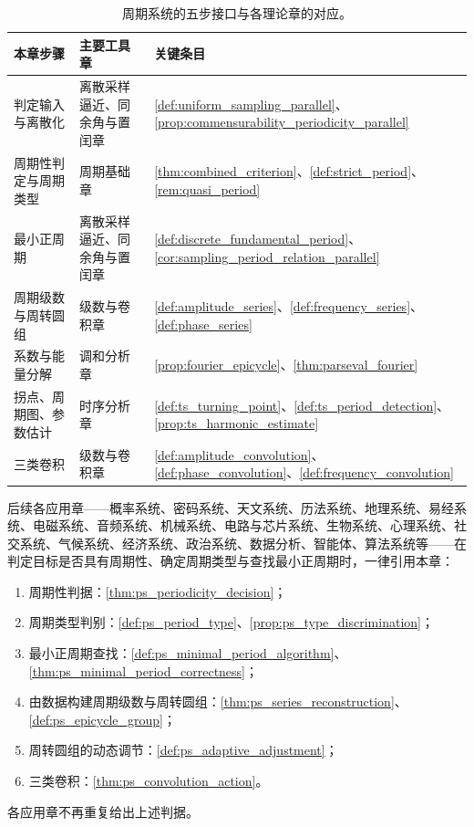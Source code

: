 \begin{table}[htbp]
\centering
\small
\begin{tabular}{@{}>{\raggedright\arraybackslash}p{4.6cm}>{\raggedright\arraybackslash}p{4.2cm}>{\raggedright\arraybackslash}p{5.6cm}@{}}
\toprule
本章步骤 & 主要工具章 & 关键条目 \\
\midrule
判定输入与离散化 & 离散采样逼近、同余角与置闰章 & \cref{def:uniform_sampling_parallel}、\cref{prop:commensurability_periodicity_parallel} \\
周期性判定与周期类型 & 周期基础章 & \cref{thm:combined_criterion}、\cref{def:strict_period}、\cref{rem:quasi_period} \\
最小正周期 & 离散采样逼近、同余角与置闰章 & \cref{def:discrete_fundamental_period}、\cref{cor:sampling_period_relation_parallel} \\
周期级数与周转圆组 & 级数与卷积章 & \cref{def:amplitude_series}、\cref{def:frequency_series}、\cref{def:phase_series} \\
系数与能量分解 & 调和分析章 & \cref{prop:fourier_epicycle}、\cref{thm:parseval_fourier} \\
拐点、周期图、参数估计 & 时序分析章 & \cref{def:ts_turning_point}、\cref{def:ts_period_detection}、\cref{prop:ts_harmonic_estimate} \\
三类卷积 & 级数与卷积章 & \cref{def:amplitude_convolution}、\cref{def:phase_convolution}、\cref{def:frequency_convolution} \\
\bottomrule
\end{tabular}
\caption{周期系统的五步接口与各理论章的对应。}
\label{tab:ps_five_steps}
\end{table}

\begin{remark}[应用章的引用约定]\label{rem:ps_applications_hook}
后续各应用章——概率系统、密码系统、天文系统、历法系统、地理系统、易经系统、电磁系统、音频系统、机械系统、电路与芯片系统、生物系统、心理系统、社交系统、气候系统、经济系统、政治系统、数据分析、智能体、算法系统等——在判定目标是否具有周期性、确定周期类型与查找最小正周期时，一律引用本章：
\begin{enumerate}[label=(\roman*)]
    \item 周期性判据：\cref{thm:ps_periodicity_decision}；
    \item 周期类型判别：\cref{def:ps_period_type}、\cref{prop:ps_type_discrimination}；
    \item 最小正周期查找：\cref{def:ps_minimal_period_algorithm}、\cref{thm:ps_minimal_period_correctness}；
    \item 由数据构建周期级数与周转圆组：\cref{thm:ps_series_reconstruction}、\cref{def:ps_epicycle_group}；
    \item 周转圆组的动态调节：\cref{def:ps_adaptive_adjustment}；
    \item 三类卷积：\cref{thm:ps_convolution_action}。
\end{enumerate}
各应用章不再重复给出上述判据。
\end{remark}

